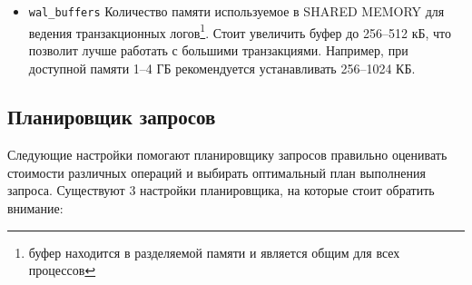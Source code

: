 \begin{itemize}
  \item \lstinline!wal_buffers! Количество памяти используемое в SHARED MEMORY для ведения транзакционных логов\footnote{буфер находится в разделяемой памяти и является общим для всех процессов}. Стоит увеличить буфер до 256--512 кБ, что позволит лучше работать с большими транзакциями. Например, при доступной памяти 1--4 ГБ рекомендуется устанавливать 256--1024 КБ.
\end{itemize}


\subsection{Планировщик запросов}


Следующие настройки помогают планировщику запросов правильно оценивать стоимости различных операций и выбирать оптимальный план выполнения запроса. Существуют 3 настройки планировщика, на которые стоит обратить внимание:


